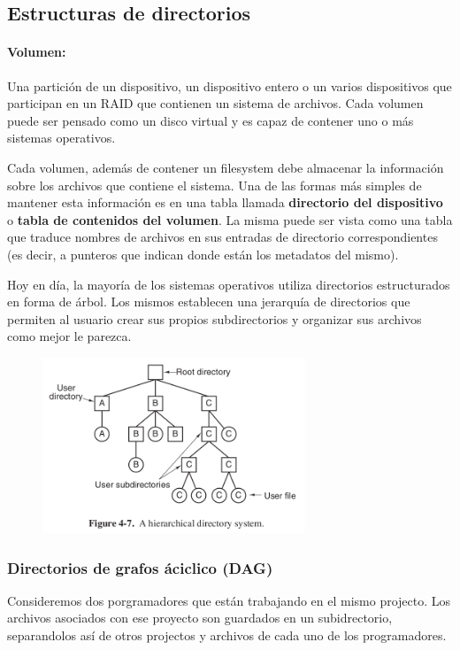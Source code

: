 \subsection{Estructuras de directorios}
\paragraph{Volumen:} Una partición de un dispositivo, un dispositivo entero o un varios dispositivos que participan en un RAID que contienen un sistema de archivos. Cada volumen puede ser pensado como un disco virtual y es capaz de contener uno o más sistemas operativos. 

Cada volumen, además de contener un filesystem debe almacenar la información sobre los archivos que contiene el sistema. Una de las formas más simples de mantener esta información es en una tabla llamada  \textbf{directorio del dispositivo} o \textbf{tabla de contenidos del volumen}. La misma puede ser vista como una tabla que traduce nombres de archivos en sus entradas de directorio correspondientes (es decir, a punteros que indican donde están los metadatos del mismo).

Hoy en día, la mayoría de los sistemas operativos utiliza directorios estructurados en forma de árbol. Los mismos establecen una jerarquía de directorios que permiten al usuario crear sus propios subdirectorios y organizar sus archivos como mejor le parezca. 

\begin{figure}[h]
	\centering
	\includegraphics[width=0.7\textwidth]{imagenes/directorio-arbol}
	\label{fig:directorio-arbol}
\end{figure}


\subsubsection{Directorios de grafos áciclico (DAG)}
Consideremos dos porgramadores que están trabajando en el mismo projecto. Los archivos asociados con ese proyecto son guardados en un subidrectorio, separandolos así de otros projectos y archivos de cada uno de los programadores.

